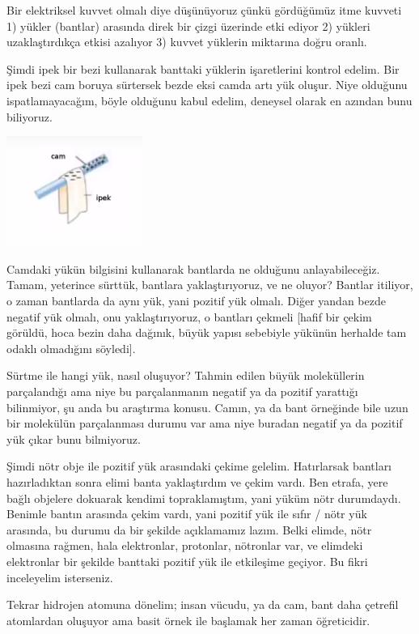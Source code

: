 \documentclass[12pt,fleqn]{article}\usepackage{../../common}
\begin{document}
Bir elektriksel kuvvet olmalı diye düşünüyoruz çünkü gördüğümüz itme kuvveti 1)
yükler (bantlar) arasında direk bir çizgi üzerinde etki ediyor 2) yükleri
uzaklaştırdıkça etkisi azalıyor 3) kuvvet yüklerin miktarına doğru oranlı.

Şimdi ipek bir bezi kullanarak banttaki yüklerin işaretlerini kontrol
edelim. Bir ipek bezi cam boruya sürtersek bezde eksi camda artı yük
oluşur. Niye olduğunu ispatlamayacağım, böyle olduğunu kabul edelim, deneysel
olarak en azından bunu biliyoruz. 

\includegraphics[width=12em]{03_08.png}

Camdaki yükün bilgisini kullanarak bantlarda ne olduğunu anlayabileceğiz. Tamam,
yeterince sürttük, bantlara yaklaştırıyoruz, ve ne oluyor? Bantlar itiliyor, o
zaman bantlarda da aynı yük, yani pozitif yük olmalı. Diğer yandan bezde negatif
yük olmalı, onu yaklaştırıyoruz, o bantları çekmeli [hafif bir çekim görüldü,
 hoca bezin daha dağınık, büyük yapısı sebebiyle yükünün herhalde tam odaklı
 olmadığını söyledi]. 

Sürtme ile hangi yük, nasıl oluşuyor? Tahmin edilen büyük moleküllerin
parçalandığı ama niye bu parçalanmanın negatif ya da pozitif yarattığı bilinmiyor,
şu anda bu araştırma konusu. Camın, ya da bant örneğinde bile uzun bir molekülün
parçalanması durumu var ama niye buradan negatif ya da pozitif yük çıkar bunu
bilmiyoruz.

Şimdi nötr obje ile pozitif yük arasındaki çekime gelelim. Hatırlarsak bantları
hazırladıktan sonra elimi banta yaklaştırdım ve çekim vardı. Ben etrafa, yere
bağlı objelere dokuarak kendimi topraklamıştım, yani yüküm nötr
durumdaydı. Benimle bantın arasında çekim vardı, yani pozitif yük ile sıfır /
nötr yük arasında, bu durumu da bir şekilde açıklamamız lazım.  Belki elimde,
nötr olmasına rağmen, hala elektronlar, protonlar, nötronlar var, ve elimdeki
elektronlar bir şekilde banttaki pozitif yük ile etkileşime geçiyor. Bu fikri
inceleyelim isterseniz.

Tekrar hidrojen atomuna dönelim; insan vücudu, ya da cam, bant daha çetrefil
atomlardan oluşuyor ama basit örnek ile başlamak her zaman öğreticidir. 
\end{document}
